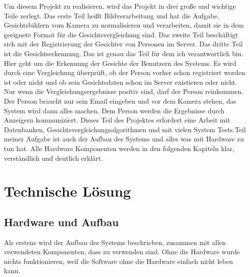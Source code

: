 Um diesem Projekt zu realisieren, wird das Projekt in drei große und wichtige Teile zerlegt. Das erste Teil heißt Bildverarbeitung und hat die Aufgabe, Gesichtsbildern vom Kamera zu normalisieren und verarbeiten, damit sie in dem geeignete Format für die Gesichtsvergleichung sind. Das zweite Teil beschäftigt sich mit der Registrierung der Gesichter von Personen im Server. Das dritte Teil ist die Gesichtserkennung. Das ist genau das Teil für dem ich verantwortlich bin. Hier geht um die Erkennung der Gesichte der Benutzern des Systems. Es wird durch eine Vergleichung überprüft, ob der Person vorher schon registriert worden ist oder nicht und ob sein Gesichtsdaten schon im Server existieren oder nicht. Nur wenn die Vergleichungsergebnisse positiv sind, darf der Person reinkommen. Der Person braucht nur sein Email eingeben und vor dem Kamera stehen, das System wird dann alles machen. Dem Person werden die Ergebnisse durch Anzeigern kommuniziert. Dieses Teil des Projektes erfordert eine Arbeit mit Datenbanken, Gesichtsvergleichungsalgorithmen und mit vielen System Tests.Teil meiner Aufgabe ist auch der Aufbau des Systems und alles was mit Hardware zu tun hat. Alle Hardware Komponenten werden in den folgenden Kapiteln klar, verständlich und deutlich erklärt.
\section{Technische Lösung}
	\subsection{Hardware und Aufbau}
Als erstens wird der Aufbau des Systems beschrieben, zusammen mit allen verwendeten Komponenten, dass zu verwenden sind. Ohne die Hardware wurde nichts funktionieren, weil die Software ohne die Hardware einfach nicht leben kann. 
